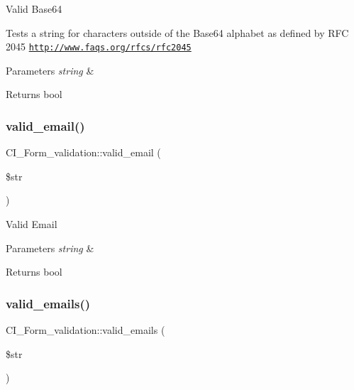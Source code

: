 Valid Base64

Tests a string for characters outside of the Base64 alphabet as defined by R\+FC 2045 \href{http://www.faqs.org/rfcs/rfc2045}{\tt http\+://www.\+faqs.\+org/rfcs/rfc2045}


\begin{DoxyParams}{Parameters}
{\em string} & \\
\hline
\end{DoxyParams}
\begin{DoxyReturn}{Returns}
bool 
\end{DoxyReturn}
\mbox{\label{class_c_i___form__validation_adbc9111bceb5b96f6ab20b218331d8d6}} 
\subsubsection{\texorpdfstring{valid\+\_\+email()}{valid\_email()}}
{\footnotesize\ttfamily C\+I\+\_\+\+Form\+\_\+validation\+::valid\+\_\+email (\begin{DoxyParamCaption}\item[{}]{\$str }\end{DoxyParamCaption})}

Valid Email


\begin{DoxyParams}{Parameters}
{\em string} & \\
\hline
\end{DoxyParams}
\begin{DoxyReturn}{Returns}
bool 
\end{DoxyReturn}
\mbox{\label{class_c_i___form__validation_a056b4fc668005c0bd99eb3ed095d89c2}} 
\subsubsection{\texorpdfstring{valid\+\_\+emails()}{valid\_emails()}}
{\footnotesize\ttfamily C\+I\+\_\+\+Form\+\_\+validation\+::valid\+\_\+emails (\begin{DoxyParamCaption}\item[{}]{\$str }\end{DoxyParamCaption})}

